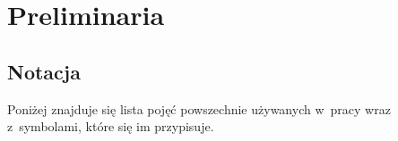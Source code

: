 \documentclass[12pt,a4paper]{report}
\begin{document}

\chapter{Preliminaria}  

\section{Notacja} 

Poniżej znajduje się lista pojęć powszechnie używanych w~pracy wraz z~symbolami, które się im  przypisuje. 
  
\end{document}
